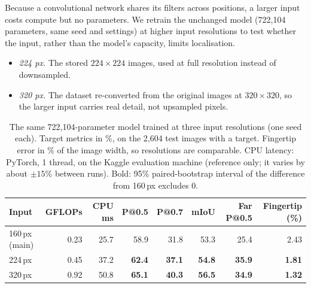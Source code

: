 Because a convolutional network shares its filters across positions, a larger input costs compute but no parameters. We retrain the unchanged model (722,104 parameters, same seed and settings) at higher input resolutions to test whether the input, rather than the model's capacity, limits localisation.
\begin{itemize}
\item \emph{224 px.} The stored $224\times224$ images, used at full resolution instead of downsampled.
\item \emph{320 px.} The dataset re-converted from the original images at $320\times320$, so the larger input carries real detail, not upsampled pixels.
\end{itemize}

\begin{table}[t]
  \caption{The same 722,104-parameter model trained at three input resolutions (one seed each). Target metrics in \%, on the 2,604 test images with a target. Fingertip error in \% of the image width, so resolutions are comparable. CPU latency: PyTorch, 1 thread, on the Kaggle evaluation machine (reference only; it varies by about ${\pm}15\%$ between runs). Bold: 95\% paired-bootstrap interval of the difference from 160\,px excludes 0.}
  \label{tab:resolution}
  \footnotesize
  \setlength{\tabcolsep}{4pt}
  \begin{tabular}{lrrrrrrr}
    \toprule
    Input & GFLOPs & CPU ms & P@0.5 & P@0.7 & mIoU & Far P@0.5 & Fingertip (\%) \\
    \midrule
    160\,px (main) & 0.23 & 25.7 & 58.9 & 31.8 & 53.3 & 25.4 & 2.43 \\
    224\,px & 0.45 & 37.2 & \textbf{62.4} & \textbf{37.1} & \textbf{54.8} & \textbf{35.9} & \textbf{1.81} \\
    320\,px & 0.92 & 50.8 & \textbf{65.1} & \textbf{40.3} & \textbf{56.5} & \textbf{34.9} & \textbf{1.32} \\
    \bottomrule
  \end{tabular}
\end{table}

